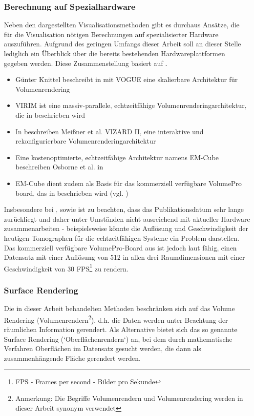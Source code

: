 \documentclass[a4paper,titlepage,12pt]{scrartcl}
\newtheorem[L]{boxedDefinition}{Definition}
\begin{document}
\subsubsection{Berechnung auf Spezialhardware}\label{sssec:specialhardwarecalculation}
Neben den dargestellten Visualisationsmethoden gibt es durchaus Ansätze, die für die Visualisation nötigen Berechnungen auf spezialisierter Hardware auszuführen. Aufgrund des geringen Umfangs dieser Arbeit soll an dieser Stelle lediglich ein Überblick über die bereits bestehenden Hardwareplattformen gegeben werden. Diese Zusammenstellung basiert auf \cite[Kapitel 2.5.5, Seite 14]{Bruckner2004}.
\begin{itemize}
 \item Günter Knittel beschreibt in \cite{Knittel1995} mit VOGUE eine skalierbare Architektur für Volumenrendering
 \item VIRIM ist eine massiv-parallele, echtzeitfähige Volumenrenderingarchitektur, die in \cite{Guenther1995} beschrieben wird
 \item In \cite{Meissner2002} beschreiben Meißner et al. VIZARD II, eine interaktive und rekonfigurierbare Volumenrenderingarchitektur
 \item Eine kostenoptimierte, echtzeitfähige Architektur namens EM-Cube beschreiben Osborne et al. in \cite{Osborne1997}
 \item EM-Cube dient zudem als Basis für das kommerziell verfügbare VolumePro board, das in \cite{Pfister1999} beschrieben wird (vgl. \cite[Kapitel 2.2.5, Seite 14]{Bruckner2004})
\end{itemize}
Insbesondere bei \cite{Knittel1995}, \cite{Guenther1995} sowie \cite{Osborne1997} ist zu beachten, dass das Publikationsdatum sehr lange zurückliegt und daher unter Umständen nicht ausreichend mit aktueller Hardware zusammenarbeiten - beispielsweise könnte die Auflösung und Geschwindigkeit der heutigen Tomographen für die echtzeitfähigen Systeme ein Problem darstellen. Das kommerziell verfügbare VolumePro-Board aus \cite{Pfister1999} ist jedoch laut \cite[Kapitel 2.2.5, Seite 14]{Bruckner2004} fähig, einen Datensatz mit einer Auflösung von 512 in allen drei Raumdimensionen mit einer Geschwindigkeit von 30 FPS\footnote{FPS - Frames per second - Bilder pro Sekunde} zu rendern.
\subsubsection{Surface Rendering}\label{sssec:surfacerendering}
Die in dieser Arbeit behandelten Methoden beschränken sich auf das Volume Rendering (\glqq Volumenrendern\grqq\footnote{Anmerkung: Die Begriffe Volumenrendern und Volumenrendering werden in dieser Arbeit synonym verwendet}), d.h. die Daten werden unter Beachtung der räumlichen Information gerendert. Als Alternative bietet sich das so genannte Surface Rendering (`Oberflächenrendern`) an, bei dem durch mathematische Verfahren Oberflächen im Datensatz gesucht werden, die dann als zusammenhängende Fläche gerendert werden. 
\end{document}
